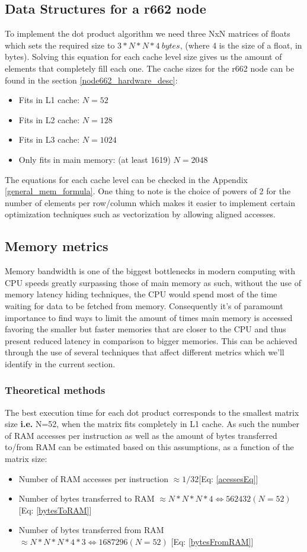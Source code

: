 \documentclass{article}
\begin{document}
\subsection{Data Structures for a r662 node}
To implement the dot product algorithm we need three NxN matrices of floats which sets the required size to $3*N*N*4\ bytes$, (where 4 is the size of a float, in 
bytes). Solving this equation for each cache level size gives us the amount of elements that completely fill each one. The cache sizes for the r662 node can be found in the section \ref{node662_hardware_desc}:
\begin{itemize}
    \item Fits in L1 cache: $N = 52 $ 
    \item Fits in L2 cache: $N = 128$ 
    \item Fits in L3 cache: $N = 1024$
    \item Only fits in main memory: (at least 1619) $N = 2048$
\end{itemize}
The equations for each cache level can be checked in the Appendix \ref{general_mem_formula}. One thing to note is the choice of powers of 2 for the number of elements
per row/column which makes it easier to implement certain optimization techniques such as vectorization by allowing aligned accesses. 

\subsection{Memory metrics}
Memory bandwidth is one of the biggest bottlenecks in modern computing with CPU speeds greatly surpassing those of main memory as such, without the use of memory latency hiding techniques, the CPU would spend most of the time waiting for data to be fetched from memory.  
Consequently it's of paramount importance to find ways to limit the amount of times main memory is accessed favoring the smaller but faster memories that are closer
to the CPU and thus present reduced latency in comparison to bigger memories. This can be achieved through the use of several techniques that affect different metrics 
which we'll identify in the current section.

\subsubsection{Theoretical methods}
The best execution time for each dot product corresponds to the smallest matrix size \textbf{i.e.} N=52, when the matrix fits completely in L1 cache. As such the
number of RAM accesses per instruction as well as the amount of bytes transferred to/from RAM can be estimated based on this assumptions, as a function of the matrix 
size:
\begin{itemize}
    \item Number of RAM accesses per instruction $ \approx 1/32$[Eq: \ref{acessesEq}]
    \item Number of bytes transferred to RAM $\approx N*N*N*4 \Leftrightarrow 562432 (N=52)$ [Eq: \ref{bytesToRAM}]
    \item Number of bytes transferred from RAM $\approx N*N*N*4*3 \Leftrightarrow 1687296 (N=52)$ [Eq: \ref{bytesFromRAM}]
\end{itemize}
\end{document}

